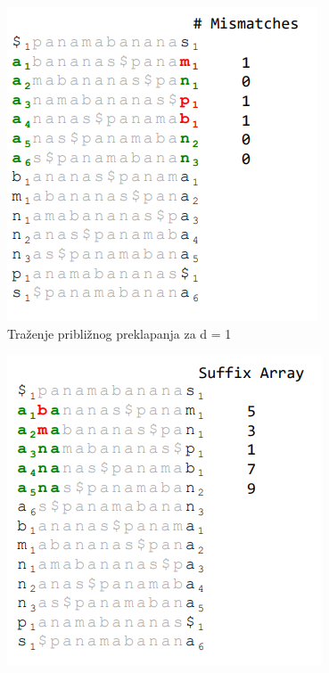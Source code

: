 \begin{minipage}{\textwidth}
	\centering
	\begin{minipage}{0.45\textwidth}
		\begin{figure}[H]
			\centering
			\includegraphics[width=\textwidth]{poglavlja/9/slike/PribliznoPreklapanjeMissmatch.png}
			\caption{Traženje približnog preklapanja za d = 1}
			\label{anaMiss1}
		\end{figure} 
	\end{minipage}
	\hfill 
	\begin{minipage}{0.45\textwidth}
		\begin{figure}[H]
			\centering
			\includegraphics[width=\textwidth]{poglavlja/9/slike/PribliznoPreklapanjeTrazenjeNiske.png}

\end{figure}
\end{minipage}
\end{minipage}
